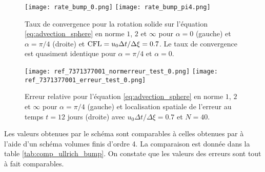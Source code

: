 \begin{figure}[htbp]
\begin{center}
\texttt{[image: rate\_bump\_0.png]}
\texttt{[image: rate\_bump\_pi4.png]}
\end{center}
\caption{Taux de convergence pour la rotation solide sur l'équation \eqref{eq:advection_sphere} en norme $1$, $2$ et $\infty$ pour $\alpha = 0$ (gauche) et $\alpha = \pi / 4$ (droite) et $\text{CFL} = u_0 \Delta t / \Delta \xi = 0.7$. Le taux de convergence est quasiment identique pour $\alpha = \pi/4$ et $\alpha=0$.}
\label{fig:rate_bump}
\end{figure}

\begin{figure}[htbp]
\begin{center}
\texttt{[image: ref\_7371377001\_normerreur\_test\_0.png]}
\texttt{[image: ref\_7371377001\_erreur\_test\_0.png]}
\end{center}
\caption{Erreur relative pour l'équation \eqref{eq:advection_sphere} en norme $1$, $2$ et $\infty$ pour $\alpha = \pi/4$ (gauche) et localisation spatiale de l'erreur au temps $t=12$ jours (droite) avec $u_0 \Delta t / \Delta \xi = 0.7$ et $N=40$.}
\label{fig:erreur_bump}
\end{figure}

Les valeurs obtenues par le schéma sont comparables à celles obtenues par \cite{Ullrich2010, Ullrich2011} à l'aide d'un schéma volumes finis d'ordre 4. La comparaison est donnée dans la table \ref{tab:comp_ullrich_bump}. On constate que les valeurs des erreurs sont tout à fait comparables.

